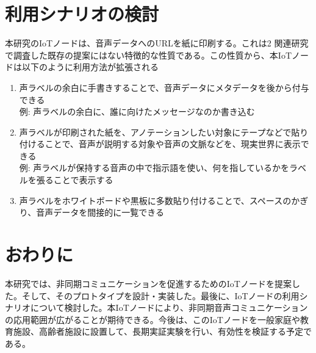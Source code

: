 \documentclass[submit,techrep,noauthor]{ipsj}
\begin{document}
\section{利用シナリオの検討}
本研究のIoTノードは、音声データへのURLを紙に印刷する。これは2 関連研究で調査した既存の提案にはない特徴的な性質である。この性質から、本IoTノードは以下のように利用方法が拡張される
\begin{enumerate}
    \item 声ラベルの余白に手書きすることで、音声データにメタデータを後から付与できる\\例: 声ラベルの余白に、誰に向けたメッセージなのか書き込む
    \item 声ラベルが印刷された紙を、アノテーションしたい対象にテープなどで貼り付けることで、音声が説明する対象や音声の文脈などを、現実世界に表示できる \\例: 声ラベルが保持する音声の中で指示語を使い、何を指しているかをラベルを張ることで表示する
    \item 声ラベルをホワイトボードや黒板に多数貼り付けることで、スペースのかぎり、音声データを間接的に一覧できる
\end{enumerate}

\section{おわりに}
本研究では、非同期コミュニケーションを促進するためのIoTノードを提案した。そして、そのプロトタイプを設計・実装した。最後に、IoTノードの利用シナリオについて検討した。本IoTノードにより、非同期音声コミュニケーションの応用範囲が広がることが期待できる。今後は、このIoTノードを一般家庭や教育施設、高齢者施設に設置して、長期実証実験を行い、有効性を検証する予定である。


 
\end{document}

